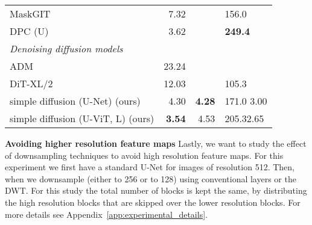 \documentclass[nohyperref]{article}
\theoremstyle{plain}
\theoremstyle{definition}
\theoremstyle{remark}
\begin{document}
\begin{table}
{\begin{tabular}{l r r l}
    MaskGIT \citep{chang2022maskgit} & 7.32 & & 156.0 \\
    DPC (U) \citep{anonymous2023discrete} & 3.62 &  & \textbf{249.4} \\ \midrule
    \textit{Denoising diffusion models} \\ 
    ADM \citep{dhariwal2021diffusionbeatgans}& 23.24 \\
    DiT-XL/2 \citep{peebles2022scalable} & 12.03 & & 105.3 \\
    simple diffusion (U-Net) (ours) & 4.30 & \textbf{4.28} & 171.0 {\small  3.00} \\
    simple diffusion (U-ViT, L) (ours) & \textbf{3.54} & 4.53 & 205.3{\small  2.65} \\
        \bottomrule
    \end{tabular}}
\end{table}


\begin{table}
    \centering
    \caption{Text to image result on zero-shot COCO}\vspace{-.2cm}
    \label{tab:text_to_image_fid}
\end{table}

\textbf{Avoiding higher resolution feature maps}
Lastly, we want to study the effect of downsampling techniques to avoid high resolution feature maps. For this experiment we first have a standard U-Net for images of resolution 512. Then, when we downsample (either to 256 or to 128) using conventional layers or the DWT. For this study the total number of blocks is kept the same, by distributing the high resolution blocks that are skipped over the lower resolution blocks. For more details see Appendix~\ref{app:experimental_details}. 
\end{document}
